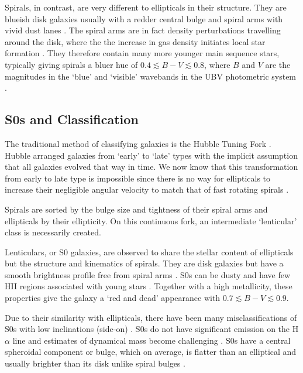 \begin{figure}
	\label{galaxy type pictures}
\end{figure}

Spirals, in contrast, are very different to ellipticals in their structure. They are blueish disk galaxies usually with a redder central bulge and spiral arms with vivid dust lanes \citep{sparke_galaxies_2000}. The spiral arms are in fact density perturbations travelling around the disk, where the the increase in gas density initiates local star formation \citep{kennicutt_star_1998}. They therefore contain many more younger  main sequence stars, typically giving spirals a bluer hue of $0.4\lesssim B-V \lesssim 0.8$, where $B$ and $V$ are the magnitudes in the `blue' and `visible' wavebands in the UBV photometric system \citep{sparke_galaxies_2000}.

\subsection{S0s and Classification}
The traditional method of classifying galaxies is the Hubble Tuning Fork \citep{hubble_no._1926}. Hubble arranged galaxies from `early' to `late' types with the implicit assumption that all galaxies evolved that way in time. We now know that this transformation from early to late type is impossible since there is no way for ellipticals to increase their negligible angular velocity to match that of fast rotating spirals \citep{carroll_introduction_2007}. 

Spirals are sorted by the bulge size and tightness of their spiral arms and ellipticals by their ellipticity. On this continuous fork, an intermediate `lenticular' class is necessarily created. 
\begin{figure}
	\label{hubble_fork}
\end{figure}
Lenticulars, or S0 galaxies, are observed to share the stellar content of ellipticals but the structure and kinematics of spirals. They are disk galaxies but have a smooth brightness profile free from spiral arms \citep{blanton_physical_2009}. S0s can be dusty and have few HII regions associated with young stars \citep{degraaff_galaxy_2007}. Together with a high metallicity, these properties give the galaxy a `red and dead' appearance with $0.7\lesssim B-V \lesssim 0.9$.

Due to their similarity with ellipticals, there have been many misclassifications of S0s with low inclinations (side-on) \citep{laurikainen_multicomponent_2005}. 
S0s do not have significant emission on the H$\alpha$ line and estimates of dynamical mass become challenging \citep{dressler_rotational_1983}. S0s have a central spheroidal component or bulge, which on average, is flatter than an elliptical and usually brighter than its disk unlike spiral bulges \citep{dressler_galaxy_1980}.

